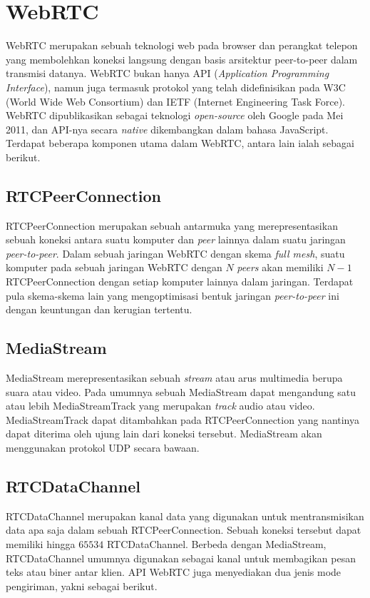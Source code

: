\section{WebRTC}
WebRTC merupakan sebuah teknologi web pada browser dan perangkat telepon yang membolehkan koneksi langsung dengan basis arsitektur peer-to-peer dalam transmisi datanya. WebRTC bukan hanya API (\textit{Application Programming Interface}), namun juga termasuk protokol yang telah didefinisikan pada W3C (World Wide Web Consortium) dan IETF (Internet Engineering Task Force). WebRTC dipublikasikan sebagai teknologi \textit{open-source} oleh Google pada Mei 2011, dan API-nya secara \textit{native} dikembangkan dalam bahasa JavaScript. Terdapat beberapa komponen utama dalam WebRTC, antara lain ialah sebagai berikut.

\subsection{RTCPeerConnection}

RTCPeerConnection merupakan sebuah antarmuka yang merepresentasikan sebuah koneksi antara suatu komputer dan \textit{peer} lainnya dalam suatu jaringan \textit{peer-to-peer}. Dalam sebuah jaringan WebRTC dengan skema \textit{full mesh}, suatu komputer pada sebuah jaringan WebRTC dengan $N$ \textit{peers} akan memiliki $N-1$ RTCPeerConnection dengan setiap komputer lainnya dalam jaringan. Terdapat pula skema-skema lain yang mengoptimisasi bentuk jaringan \textit{peer-to-peer} ini dengan keuntungan dan kerugian tertentu.
    
\subsection{MediaStream}

MediaStream merepresentasikan sebuah \textit{stream} atau arus multimedia berupa suara atau video. Pada umumnya sebuah MediaStream dapat mengandung satu atau lebih MediaStreamTrack yang merupakan \textit{track} audio atau video. MediaStreamTrack dapat ditambahkan pada RTCPeerConnection yang nantinya dapat diterima oleh ujung lain dari koneksi tersebut. MediaStream akan menggunakan protokol UDP secara bawaan.
\subsection{RTCDataChannel}
RTCDataChannel merupakan kanal data yang digunakan untuk mentransmisikan data apa saja dalam sebuah RTCPeerConnection. Sebuah koneksi tersebut dapat memiliki hingga $65534$ RTCDataChannel. Berbeda dengan MediaStream, RTCDataChannel umumnya digunakan sebagai kanal untuk membagikan pesan teks atau biner antar klien. API WebRTC juga menyediakan dua jenis mode pengiriman, yakni sebagai berikut.

